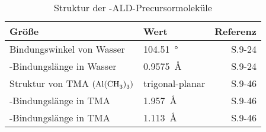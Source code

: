 \begin{table}[!h]
  \centering
  \caption{Struktur der -ALD-Precursormoleküle}
  \evenrowcolors
  \begin{tabularx}{\textwidth}{|XXR|}
    \hline
    \textbf{Größe}                                & \textbf{Wert}          & \textbf{Referenz}             \\
    \hline
    Bindungswinkel von Wasser                     & \SI{104.51}{\degree}   & \cite{haynes_crc_2011} S.9-24 \\
    -Bindungslänge in Wasser              & \SI{0.9575}{\angstrom} & \cite{haynes_crc_2011} S.9-24 \\
    Struktur von TMA $\left(\ce{Al(CH3)3}\right)$ & trigonal-planar        & \cite{haynes_crc_2011} S.9-46 \\
    -Bindungslänge in TMA                & \SI{1.957}{\angstrom}  & \cite{haynes_crc_2011} S.9-46 \\
    -Bindungslänge in TMA                 & \SI{1.113}{\angstrom}  & \cite{haynes_crc_2011} S.9-46 \\
    \hline
  \end{tabularx}
\end{table}
